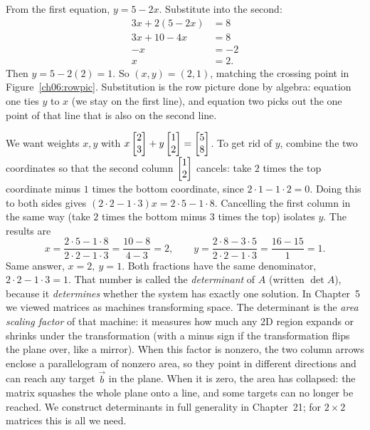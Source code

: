 \begin{example}
\label{ch06:ex-sub}
From the first equation, $y = 5 - 2x$. Substitute into the second:
\[
\begin{aligned}
  3x + 2(5-2x) &= 8\\
  3x + 10 - 4x &= 8\\
  -x &= -2\\
  x &= 2.
\end{aligned}
\]
Then $y = 5 - 2(2) = 1$. So $(x,y)=(2,1)$, matching the crossing point in
Figure~\ref{ch06:rowpic}. Substitution is the row picture done by algebra:
equation one ties $y$ to $x$ (we stay on the first line), and equation two
picks out the one point of that line that is also on the second line.
\end{example}

\begin{example}
\label{ch06:ex-col}
We want weights $x,y$ with $x\begin{bmatrix}2\\3\end{bmatrix}+y\begin{bmatrix}1\\2\end{bmatrix}=\begin{bmatrix}5\\8\end{bmatrix}$.
To get rid of $y$, combine the two coordinates so that the second column
$\begin{bmatrix}1\\2\end{bmatrix}$ cancels: take $2$ times the top coordinate minus $1$ times
the bottom coordinate, since $2\cdot 1 - 1\cdot 2 = 0$. Doing this to both
sides gives $(2\cdot 2 - 1\cdot 3)x = 2\cdot 5 - 1\cdot 8$. Cancelling the
first column in the same way (take $2$ times the bottom minus $3$ times the
top) isolates $y$. The results are
\[
  x = \frac{2\cdot 5 - 1\cdot 8}{2\cdot 2 - 1\cdot 3}=\frac{10-8}{4-3}=2,
  \qquad
  y = \frac{2\cdot 8 - 3\cdot 5}{2\cdot 2 - 1\cdot 3}=\frac{16-15}{1}=1.
\]
Same answer, $x=2,\ y=1$. Both fractions have the same denominator,
$2\cdot2-1\cdot3=1$. That number is called the \emph{determinant} of $A$
(written $\det A$), because it \emph{determines} whether the system has
exactly one solution. In Chapter~5 we viewed matrices as machines
transforming space. The determinant is the \emph{area scaling factor} of
that machine: it measures how much any 2D region expands or shrinks under
the transformation (with a minus sign if the transformation flips the plane
over, like a mirror). When this factor is nonzero, the two column arrows
enclose a parallelogram of nonzero area, so they point in different
directions and can reach any target $\vec b$ in the plane. When it is zero,
the area has collapsed: the matrix squashes the whole plane onto a line, and
some targets can no longer be reached. We construct determinants in full
generality in Chapter~21; for $2\times 2$ matrices this is all we need.
\end{example}

